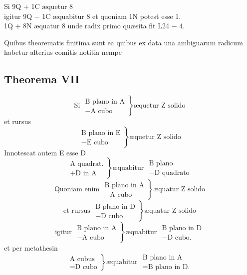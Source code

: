 \documentclass[11pt,a4paper]{article}
\begin{document}
Si 9Q + 1C æquetur 8\\
igitur 9Q $-$ 1C æquabitur 8 et quoniam 1N potest esse 1.\\
1Q + 8N æquatur 8 unde radix primo quæsita fit L24 $-$ 4.

Quibus theorematis finitima sunt ea quibus ex data una ambiguarum radicum habetur alterius comitis notitia nempe

\subsection*{Theorema VII}

\[ \text{Si } \left.\begin{array}{l} \text{B plano in A} \\ -\text{A cubo} \end{array}\right\} \text{æquetur Z solido} \]
et rursus
\[ \left.\begin{array}{l} \text{B plano in E} \\ -\text{E cubo} \end{array}\right\} \text{æquetur Z solido} \]
Innotescat autem E esse D
\[ \left.\begin{array}{l} \text{A quadrat.} \\ +\text{D in A} \end{array}\right\} \text{æquabitur } \begin{array}{l} \text{B plano} \\ -\text{D quadrato} \end{array} \]
\[ \text{Quoniam enim } \left.\begin{array}{l} \text{B plano in A} \\ -\text{A cubo} \end{array}\right\} \text{æquatur Z solido} \]
\[ \text{et rursus } \left.\begin{array}{l} \text{B plano in D} \\ -\text{D cubo} \end{array}\right\} \text{æquatur Z solido} \]
\[ \text{igitur } \left.\begin{array}{l} \text{B plano in A} \\ -\text{A cubo} \end{array}\right\} \text{æquabitur } \begin{array}{l} \text{B plano in D} \\ -\text{D cubo.} \end{array} \]
et per metathesin
\[ \left.\begin{array}{l} \text{A cubus} \\ =\text{D cubo} \end{array}\right\} \text{æquabitur } \begin{array}{l} \text{B plano in A} \\ =\text{B plano in D.} \end{array} \]
\end{document}
